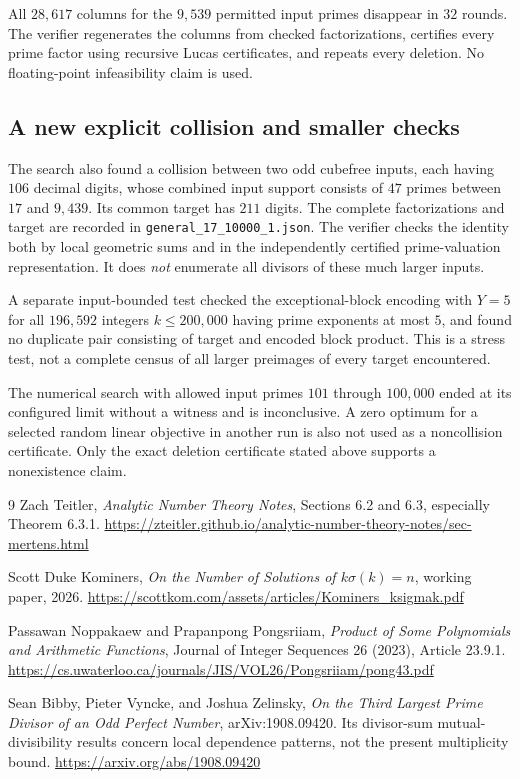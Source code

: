 \documentclass[11pt]{article}
\begin{document}
All $28{,}617$ columns for the $9{,}539$ permitted input primes disappear in $32$ rounds. The verifier regenerates the columns from checked factorizations, certifies every prime factor using recursive Lucas certificates, and repeats every deletion. No floating-point infeasibility claim is used.

\subsection*{A new explicit collision and smaller checks}
The search also found a collision between two odd cubefree inputs, each having $106$ decimal digits, whose combined input support consists of $47$ primes between $17$ and $9{,}439$. Its common target has $211$ digits. The complete factorizations and target are recorded in \texttt{general\_17\_10000\_1.json}. The verifier checks the identity both by local geometric sums and in the independently certified prime-valuation representation. It does \emph{not} enumerate all divisors of these much larger inputs.

A separate input-bounded test checked the exceptional-block encoding with $Y=5$ for all $196{,}592$ integers $k\le200{,}000$ having prime exponents at most $5$, and found no duplicate pair consisting of target and encoded block product. This is a stress test, not a complete census of all larger preimages of every target encountered.

The numerical search with allowed input primes $101$ through $100{,}000$ ended at its configured limit without a witness and is inconclusive. A zero optimum for a selected random linear objective in another run is also not used as a noncollision certificate. Only the exact deletion certificate stated above supports a nonexistence claim.

\begin{thebibliography}{9}
Zach Teitler, \emph{Analytic Number Theory Notes}, Sections 6.2 and 6.3, especially Theorem 6.3.1.\newline
\url{https://zteitler.github.io/analytic-number-theory-notes/sec-mertens.html}

Scott Duke Kominers, \emph{On the Number of Solutions of $k\sigma(k)=n$}, working paper, 2026.\newline
\url{https://scottkom.com/assets/articles/Kominers_ksigmak.pdf}

Passawan Noppakaew and Prapanpong Pongsriiam, \emph{Product of Some Polynomials and Arithmetic Functions}, Journal of Integer Sequences 26 (2023), Article 23.9.1.\newline
\url{https://cs.uwaterloo.ca/journals/JIS/VOL26/Pongsriiam/pong43.pdf}

Sean Bibby, Pieter Vyncke, and Joshua Zelinsky, \emph{On the Third Largest Prime Divisor of an Odd Perfect Number}, arXiv:1908.09420. Its divisor-sum mutual-divisibility results concern local dependence patterns, not the present multiplicity bound.\newline
\url{https://arxiv.org/abs/1908.09420}
\end{thebibliography}
\end{document}
